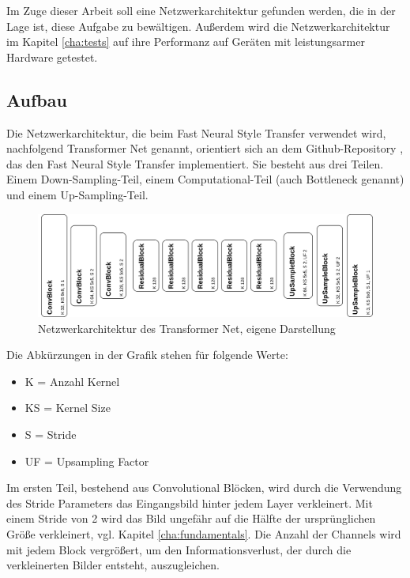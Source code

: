 Im Zuge dieser Arbeit soll eine Netzwerkarchitektur gefunden werden, die in der Lage ist, diese Aufgabe zu bewältigen. Außerdem wird die Netzwerkarchitektur im Kapitel \ref{cha:tests} auf ihre Performanz auf Geräten mit leistungsarmer Hardware getestet.

\subsection{Aufbau}
\label{sec:aufbau}

Die Netzwerkarchitektur, die beim Fast Neural Style Transfer verwendet wird, nachfolgend Transformer Net genannt, orientiert sich an dem Github-Repository \cite{PyTorchFastNeuralStyle}, das den Fast Neural Style Transfer implementiert.
Sie besteht aus drei Teilen. Einem Down-Sampling-Teil, einem Computational-Teil (auch Bottleneck genannt) und einem Up-Sampling-Teil.

\begin{figure}[H]
	\centering
	\includegraphics[width=1.0\textwidth]{resources/content/transformer_net.png}
	\caption{Netzwerkarchitektur des Transformer Net, eigene Darstellung}
	\label{img:transformer_net_img}
\end{figure}

Die Abkürzungen in der Grafik stehen für folgende Werte:

\begin{itemize}
	\item K = Anzahl Kernel
	\item KS = Kernel Size
	\item S = Stride
	\item UF = Upsampling Factor
\end{itemize}

Im ersten Teil, bestehend aus Convolutional Blöcken, wird durch die Verwendung des Stride Parameters das Eingangsbild hinter jedem Layer verkleinert. Mit einem Stride von 2 wird das Bild ungefähr auf die Hälfte der ursprünglichen Größe verkleinert, vgl. Kapitel \ref{cha:fundamentals}. Die Anzahl der Channels wird mit jedem Block vergrößert, um den Informationsverlust, der durch die verkleinerten Bilder entsteht, auszugleichen.


